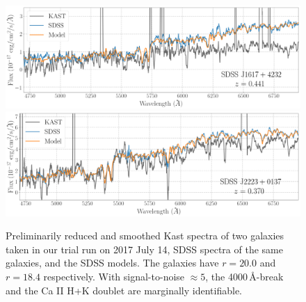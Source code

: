 \documentclass[letterpaper,12pt]{article}
\begin{document}
\begin{figure}[hbt]
\includegraphics[width=6in]{J1617.pdf}
\includegraphics[width=6in]{J2223.pdf}
\caption{
Preliminarily reduced and smoothed Kast spectra of two galaxies taken in our trial run on 2017 July 14, SDSS
spectra of the same galaxies, and the SDSS models. The galaxies have $r=20.0$ and $r=18.4$ respectively. With
signal-to-noise $\approx5$, the 4000\,\AA-break and the Ca II H+K doublet are marginally identifiable.}
\end{figure}
\end{document}
